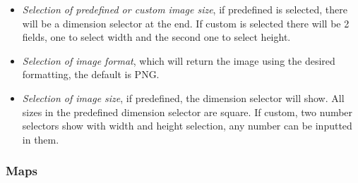\documentclass[
  a4paper]{article}
\providecommand{\tightlist}{%
  \setlength{\itemsep}{0pt}\setlength{\parskip}{0pt}}
\begin{document}
\begin{itemize}
  \begin{itemize}
  \tightlist
  \item
    \emph{Selection of predefined or custom image size}, if predefined
    is selected, there will be a dimension selector at the end. If
    custom is selected there will be 2 fields, one to select width and
    the second one to select height.
  \item
    \emph{Selection of image format}, which will return the image using
    the desired formatting, the default is PNG.
  \item
    \emph{Selection of image size}, if predefined, the dimension
    selector will show. All sizes in the predefined dimension selector
    are square. If custom, two number selectors show with width and
    height selection, any number can be inputted in them.
  \end{itemize}
\end{itemize}

\hypertarget{MapsLayout}{%
\subsubsection{Maps}\label{MapsLayout}}
\end{document}
